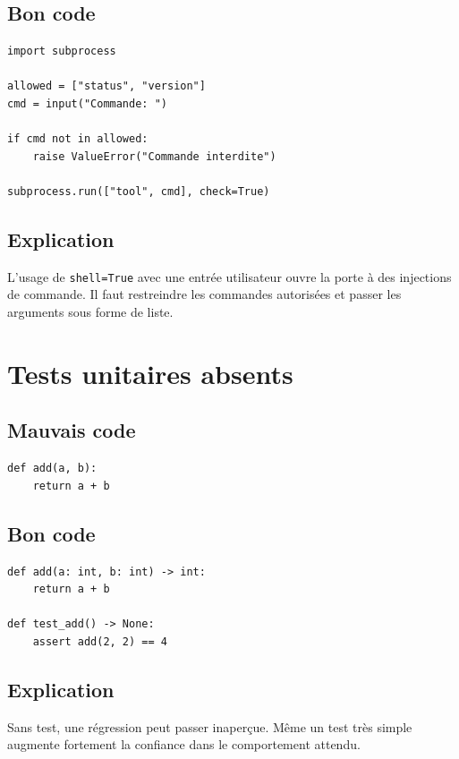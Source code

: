 \documentclass[a4paper,11pt]{report}
\begin{document}
\section{Bon code}
\begin{lstlisting}
import subprocess

allowed = ["status", "version"]
cmd = input("Commande: ")

if cmd not in allowed:
    raise ValueError("Commande interdite")

subprocess.run(["tool", cmd], check=True)
\end{lstlisting}

\section{Explication}
L'usage de \texttt{shell=True} avec une entrée utilisateur ouvre la porte à des injections de commande.
Il faut restreindre les commandes autorisées et passer les arguments sous forme de liste.

\chapter{Tests unitaires absents}

\section{Mauvais code}
\begin{lstlisting}
def add(a, b):
    return a + b
\end{lstlisting}

\section{Bon code}
\begin{lstlisting}
def add(a: int, b: int) -> int:
    return a + b

def test_add() -> None:
    assert add(2, 2) == 4
\end{lstlisting}

\section{Explication}
Sans test, une régression peut passer inaperçue.
Même un test très simple augmente fortement la confiance dans le comportement attendu.

\end{document}
